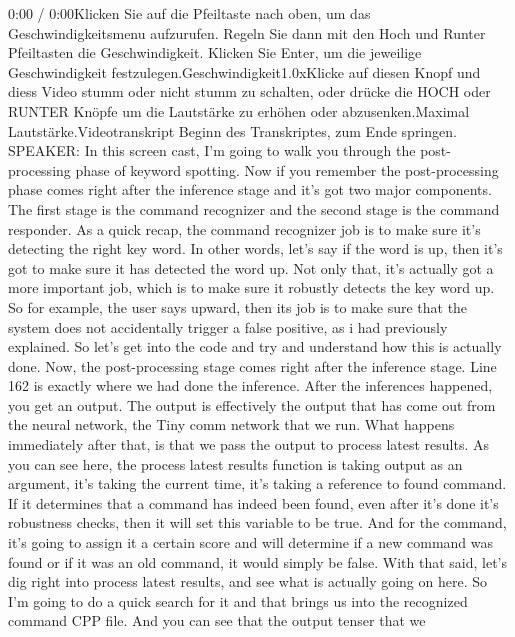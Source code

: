     0:00 / 0:00Klicken Sie auf die Pfeiltaste nach oben, um das Geschwindigkeitsmenu aufzurufen. Regeln Sie dann mit den Hoch und Runter Pfeiltasten die Geschwindigkeit. Klicken Sie Enter, um die jeweilige Geschwindigkeit festzulegen.Geschwindigkeit1.0xKlicke auf diesen Knopf und diess Video stumm oder nicht stumm zu schalten, oder drücke die HOCH oder RUNTER Knöpfe um die Lautstärke zu erhöhen oder abzusenken.Maximal Lautstärke.Videotranskript
    Beginn des Transkriptes, zum Ende springen.
    SPEAKER: In this screen cast, I'm going to walk you
    through the post-processing phase of keyword spotting.
    Now if you remember the post-processing phase
    comes right after the inference stage and it's got two major components.
    The first stage is the command recognizer
    and the second stage is the command responder.
    As a quick recap, the command recognizer job
    is to make sure it's detecting the right key word.
    In other words, let's say if the word is up,
    then it's got to make sure it has detected the word up.
    Not only that, it's actually got a more important job,
    which is to make sure it robustly detects the key word up.
    So for example, the user says upward, then
    its job is to make sure that the system does not accidentally
    trigger a false positive, as i had previously explained.
    So let's get into the code and try and understand how this is actually done.
    Now, the post-processing stage comes right after the inference stage.
    Line 162 is exactly where we had done the inference.
    After the inferences happened, you get an output.
    The output is effectively the output that
    has come out from the neural network, the Tiny comm network that we run.
    What happens immediately after that, is that we pass the output to process
    latest results.
    As you can see here, the process latest results function
    is taking output as an argument, it's taking the current time,
    it's taking a reference to found command.
    If it determines that a command has indeed
    been found, even after it's done it's robustness checks,
    then it will set this variable to be true.
    And for the command, it's going to assign it a certain score
    and will determine if a new command was found or if it was an old command,
    it would simply be false.
    With that said, let's dig right into process latest results,
    and see what is actually going on here.
    So I'm going to do a quick search for it and that brings us
    into the recognized command CPP file.
    And you can see that the output tenser that we
